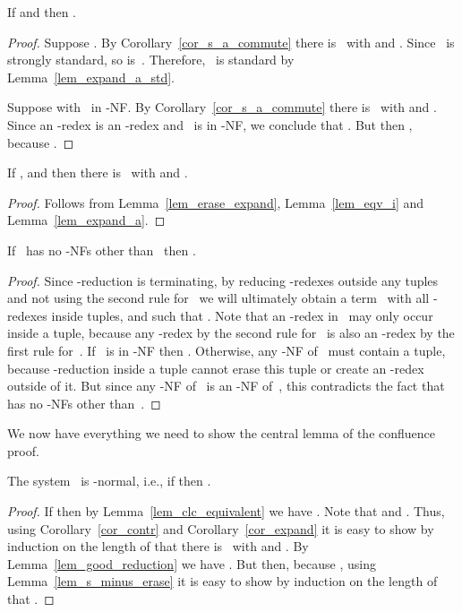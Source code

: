 \documentclass[a4paper,UKenglish]{lipics-v2016}
\begin{document}
\begin{lemma}\label{lem_expand_a}
  If  and  then .
\end{lemma}

\begin{proof}
  Suppose . By Corollary~\ref{cor_s_a_commute}
  there is~ with  and . Since~ is strongly standard, so is~. Therefore,~
  is standard by Lemma~\ref{lem_expand_a_std}.

  Suppose  with~ in -NF. By
  Corollary~\ref{cor_s_a_commute} there is~ with
   and . Since an -redex
  is an -redex and~ is in -NF, we conclude that
  . But then , because
  .
\end{proof}

\begin{corollary}\label{cor_expand}
  If ,  and
   then there is~ with
   and .
\end{corollary}

\begin{proof}
  Follows from Lemma~\ref{lem_erase_expand}, Lemma~\ref{lem_eqv_i} and
  Lemma~\ref{lem_expand_a}.
\end{proof}

\begin{lemma}\label{lem_good_reduction}
  If~ has no -NFs other than~ then
  .
\end{lemma}

\begin{proof}
  Since -reduction is terminating, by reducing -redexes outside
  any tuples and not using the second rule for~ we will
  ultimately obtain a term~ with all -redexes inside tuples,
  and such that . Note that an -redex in~
  may only occur inside a tuple, because any -redex by the second
  rule for~ is also an -redex by the first rule
  for~. If~ is in -NF then . Otherwise,
  any -NF of~ must contain a tuple, because -reduction
  inside a tuple cannot erase this tuple or create an -redex
  outside of it. But since any -NF of~ is an -NF of~,
  this contradicts the fact that~ has no -NFs other
  than~.
\end{proof}

We now have everything we need to show the central lemma of the
confluence proof.

\begin{lemma}\label{lem_f_nf}
  The system~ is -normal, i.e., if  then
  .
\end{lemma}

\begin{proof}
  If  then by Lemma~\ref{lem_clc_equivalent} we have
  . Note that  and
  . Thus, using Corollary~\ref{cor_contr}
  and Corollary~\ref{cor_expand} it is easy to show by induction on
  the length of  that there is~ with
   and . By
  Lemma~\ref{lem_good_reduction} we have . But
  then, because , using
  Lemma~\ref{lem_s_minus_erase} it is easy to show by induction on the
  length of  that
  .
\end{proof}
\end{document}
